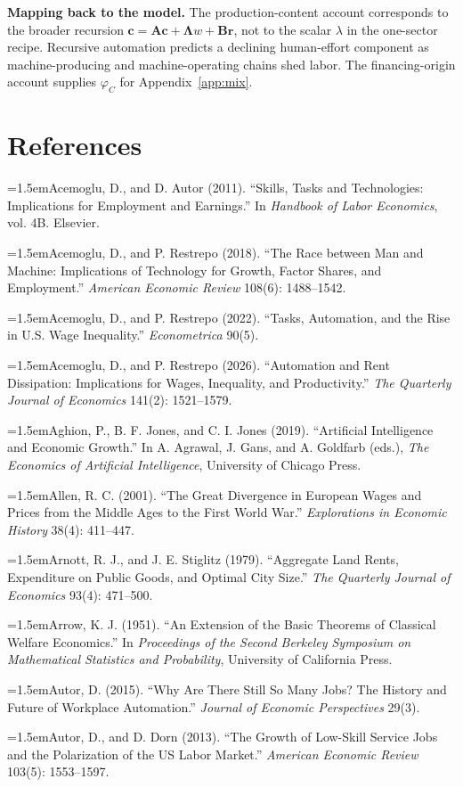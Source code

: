 \documentclass[12pt]{article}
\theoremstyle{plain}
\newcommand{\refentry}[1]{\par\hangindent=1.5em\hangafter=1\noindent #1}
\begin{document}
\textbf{Mapping back to the model.} The production-content account
corresponds to the broader recursion
$\mathbf{c}=\mathbf{A}\mathbf{c}+\boldsymbol{\Lambda}w+\mathbf{B}\mathbf{r}$,
not to the scalar $\lambda$ in the one-sector recipe. Recursive automation
predicts a declining human-effort component as machine-producing and
machine-operating chains shed labor. The financing-origin account supplies
$\varphi_C$ for Appendix~\ref{app:mix}.

\section*{References}

{\small\singlespacing
\refentry{Acemoglu, D., and D. Autor (2011). ``Skills, Tasks and Technologies: Implications for Employment and Earnings.'' In \emph{Handbook of Labor Economics}, vol. 4B. Elsevier.}
\refentry{Acemoglu, D., and P. Restrepo (2018). ``The Race between Man and Machine: Implications of Technology for Growth, Factor Shares, and Employment.'' \emph{American Economic Review} 108(6): 1488--1542.}
\refentry{Acemoglu, D., and P. Restrepo (2022). ``Tasks, Automation, and the Rise in U.S. Wage Inequality.'' \emph{Econometrica} 90(5).}
\refentry{Acemoglu, D., and P. Restrepo (2026). ``Automation and Rent Dissipation: Implications for Wages, Inequality, and Productivity.'' \emph{The Quarterly Journal of Economics} 141(2): 1521--1579.}
\refentry{Aghion, P., B. F. Jones, and C. I. Jones (2019). ``Artificial Intelligence and Economic Growth.'' In A. Agrawal, J. Gans, and A. Goldfarb (eds.), \emph{The Economics of Artificial Intelligence}, University of Chicago Press.}
\refentry{Allen, R. C. (2001). ``The Great Divergence in European Wages and Prices from the Middle Ages to the First World War.'' \emph{Explorations in Economic History} 38(4): 411--447.}
\refentry{Arnott, R. J., and J. E. Stiglitz (1979). ``Aggregate Land Rents, Expenditure on Public Goods, and Optimal City Size.'' \emph{The Quarterly Journal of Economics} 93(4): 471--500.}
\refentry{Arrow, K. J. (1951). ``An Extension of the Basic Theorems of Classical Welfare Economics.'' In \emph{Proceedings of the Second Berkeley Symposium on Mathematical Statistics and Probability}, University of California Press.}
\refentry{Autor, D. (2015). ``Why Are There Still So Many Jobs? The History and Future of Workplace Automation.'' \emph{Journal of Economic Perspectives} 29(3).}
\refentry{Autor, D., and D. Dorn (2013). ``The Growth of Low-Skill Service Jobs and the Polarization of the US Labor Market.'' \emph{American Economic Review} 103(5): 1553--1597.}
}
\end{document}

